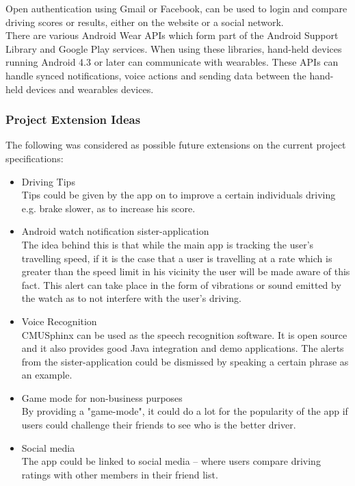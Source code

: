 Open authentication using Gmail or Facebook, can be used to login and compare driving scores or results, either on the website or a social network.\\

There are various Android Wear APIs which form part of the Android Support Library and Google Play services. When using these libraries, hand-held devices running Android 4.3 or later can communicate with wearables. These APIs can handle synced notifications, voice actions and sending data between the hand-held devices and wearables devices.
	
\subsubsection{Project Extension Ideas}
The following was considered as possible future extensions on the current project specifications:

\begin{itemize}
	\item Driving Tips\\
	Tips could be given by the app on to improve a certain individuals driving e.g. brake slower, as to increase his score.
	\item Android watch notification sister-application\\
The idea behind this is that while the main app is tracking the user's travelling speed, if it is the case that a user is travelling at a rate which is greater than the speed limit in his vicinity the user will be made aware of this fact. This alert can take place in the form of vibrations or sound emitted by the watch as to not interfere with the user's driving.
	\item Voice Recognition\\
	CMUSphinx can be used as the speech recognition software. It is open source and it also provides good Java integration and demo applications. The alerts from the sister-application could be dismissed by speaking a certain phrase as an example.\\
	\item Game mode for non-business purposes\\
	By providing a "game-mode", it could do a lot for the popularity of the app if users could challenge their friends to see who is the better driver.
	\item Social media\\
The app could be linked to social media – where users compare driving ratings with other members in their friend list.
\end{itemize}